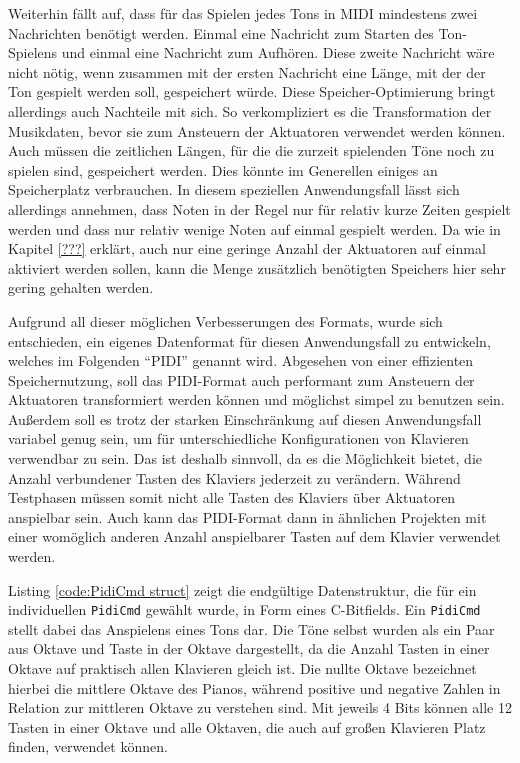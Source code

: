 Weiterhin fällt auf, dass für das Spielen jedes Tons in \ac{MIDI} mindestens zwei Nachrichten benötigt werden.
Einmal eine Nachricht zum Starten des Ton-Spielens und einmal eine Nachricht zum Aufhören.
Diese zweite Nachricht wäre nicht nötig, wenn zusammen mit der ersten Nachricht eine Länge, mit der der Ton gespielt werden soll, gespeichert würde.
Diese Speicher-Optimierung bringt allerdings auch Nachteile mit sich.
So verkompliziert es die Transformation der Musikdaten, bevor sie zum Ansteuern der Aktuatoren verwendet werden können.
Auch müssen die zeitlichen Längen, für die die zurzeit spielenden Töne noch zu spielen sind, gespeichert werden.
Dies könnte im Generellen einiges an Speicherplatz verbrauchen.
In diesem speziellen Anwendungsfall lässt sich allerdings annehmen, dass Noten in der Regel nur für relativ kurze Zeiten gespielt werden und dass nur relativ wenige Noten auf einmal gespielt werden.
Da wie in Kapitel \ref{???} erklärt, auch nur eine geringe Anzahl der Aktuatoren auf einmal aktiviert werden sollen, kann die Menge zusätzlich benötigten Speichers hier sehr gering gehalten werden.

Aufgrund all dieser möglichen Verbesserungen des Formats, wurde sich entschieden, ein eigenes Datenformat für diesen Anwendungsfall zu entwickeln, welches im Folgenden \enquote{\ac{PIDI}} genannt wird.
Abgesehen von einer effizienten Speichernutzung, soll das \ac{PIDI}-Format auch performant zum Ansteuern der Aktuatoren transformiert werden können und möglichst simpel zu benutzen sein.
Außerdem soll es trotz der starken Einschränkung auf diesen Anwendungsfall variabel genug sein, um für unterschiedliche Konfigurationen von Klavieren verwendbar zu sein.
Das ist deshalb sinnvoll, da es die Möglichkeit bietet, die Anzahl verbundener Tasten des Klaviers jederzeit zu verändern.
Während Testphasen müssen somit nicht alle Tasten des Klaviers über Aktuatoren anspielbar sein.
Auch kann das \ac{PIDI}-Format dann in ähnlichen Projekten mit einer womöglich anderen Anzahl anspielbarer Tasten auf dem Klavier verwendet werden.

Listing \ref{code:PidiCmd struct} zeigt die endgültige Datenstruktur, die für ein individuellen \lstinline{PidiCmd} gewählt wurde, in Form eines C-Bitfields.
Ein \lstinline{PidiCmd} stellt dabei das Anspielens eines Tons dar.
Die Töne selbst wurden als ein Paar aus Oktave und Taste in der Oktave dargestellt, da die Anzahl Tasten in einer Oktave auf praktisch allen Klavieren gleich ist.
Die nullte Oktave bezeichnet hierbei die mittlere Oktave des Pianos, während positive und negative Zahlen in Relation zur mittleren Oktave zu verstehen sind.
Mit jeweils 4 Bits können alle 12 Tasten in einer Oktave und alle Oktaven, die auch auf großen Klavieren Platz finden, verwendet können.


